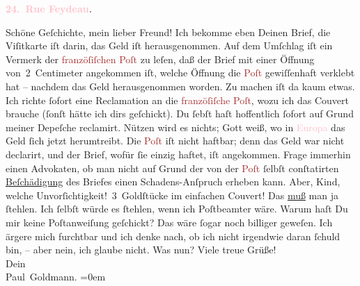            \pstart
           \begin{otherlanguage}{french}\textcolor{gray}{\textbf{\textbf{\textcolor{pink}{24. Rue Feydeau}{}\ledrightnote{\textcolor{pink}{rue Feydeau}}.}}}\end{otherlanguage}\pend
           {\bigskip}\pstart
           Schöne Geſchichte, mein lieber Freund! Ich bekomme
               eben Deinen Brief, die Viſitkarte iſt darin, das Geld iſt herausgenommen. Auf dem
               Umſchlag iſt ein Vermerk der \textcolor{brown}{franzöſiſchen Poſt}{}\ledrightnote{\textcolor{brown}{Französische Post}}
               zu leſen, daß der Brief mit einer Öffnung von 2 Centimeter angekommen iſt, welche
               Öffnung die \textcolor{brown}{Poſt}{}\ledrightnote{\textcolor{brown}{Französische Post}} gewiſſenhaft  verklebt hat – nachdem das Geld herausgenommen
               worden. Zu machen iſt da kaum etwas. Ich richte ſofort eine Reclamation an die \textcolor{brown}{franzöſiſche Poſt}{}\ledrightnote{\textcolor{brown}{Französische Post}}, wozu ich das Couvert brauche
               (ſonſt hätte ich dirs geſchickt). {\pb}Du ſebſt haſt
               hoffentlich ſofort auf Grund meiner Depeſche reclamirt. Nützen wird es nichts; Gott
               weiß, wo in \textcolor{pink}{Europa}{}\ledrightnote{\textcolor{pink}{Europa}} das Geld ſich jetzt
               herumtreibt. Die \textcolor{brown}{Poſt}{}\ledrightnote{\textcolor{brown}{Französische Post}} iſt nicht haftbar; denn das
               Geld war nicht declarirt, und der Brief, wofür ſie einzig haftet, iſt angekommen.
               Frage immerhin einen Advokaten, ob man nicht auf Grund der von der \textcolor{brown}{Poſt}{}\ledrightnote{\textcolor{brown}{Französische Post}} ſelbſt conſtatirten \uline{Beſchädigung} des Briefes einen Schadens-Anſpruch erheben kann. {\pb}Aber, Kind, welche Unvorſichtigkeit! 3 Goldſtücke im
               einfachen Couvert! Das \uline{muß} man ja ſtehlen. Ich ſelbſt
               würde es ſtehlen, wenn ich Poſtbeamter wäre. Warum haſt Du mir keine Poſtanweiſung
               geſchickt? Das wäre ſogar noch billiger geweſen.\pend
           \pstart
           Ich ärgere mich furchtbar\strikeout{,} und ich denke nach, ob ich
               nicht irgendwie daran ſchuld bin, – aber nein, ich glaube nicht.\pend
           \pstart
           {\pb}Was nun?\pend
           \pstart
           Viele treue Grüße! {\\[\baselineskip]}Dein{\\[\baselineskip]}\spacefill\mbox{Paul Goldmann.}\pend
           \leftskip=0em{}\endnumbering{}  
      
